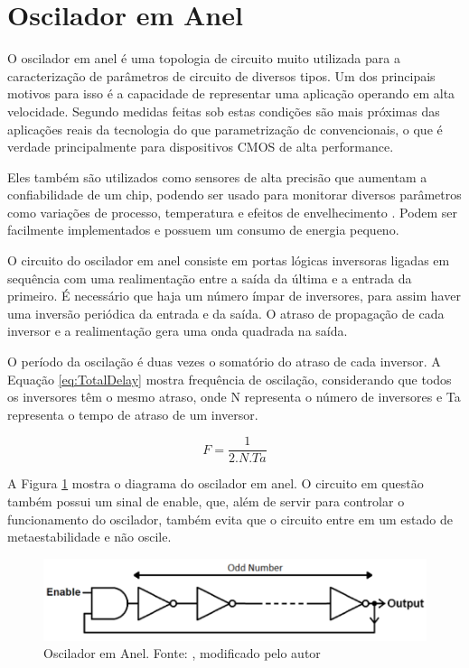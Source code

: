 \section{Oscilador em Anel}
O oscilador em anel é uma topologia de circuito muito utilizada para a caracterização de parâmetros de circuito de diversos tipos. Um dos principais motivos para isso é a capacidade de representar uma aplicação operando em alta velocidade. Segundo \cite{Bhushan} medidas feitas sob estas condições são mais próximas das aplicações reais da tecnologia do que parametrização dc convencionais, o que é verdade principalmente para dispositivos CMOS de alta performance.

Eles também são utilizados como sensores de alta precisão que aumentam a confiabilidade de um chip, podendo ser usado para monitorar diversos parâmetros como variações de processo, temperatura e efeitos de envelhecimento \cite{Sato}. Podem ser facilmente implementados e possuem um consumo de energia pequeno.

O circuito do oscilador em anel consiste em portas lógicas inversoras ligadas em sequência com uma realimentação entre a saída da última e a entrada da primeiro. É necessário que haja um número ímpar de inversores, para assim haver uma inversão periódica da entrada e da saída. O atraso de propagação de cada inversor e a realimentação gera uma onda quadrada na saída.

O período da oscilação é duas vezes o somatório do atraso de cada inversor. A Equação \ref{eq:TotalDelay} mostra frequência de oscilação, considerando que todos os inversores têm o mesmo atraso, onde N representa o número de inversores e Ta representa o tempo de atraso de um inversor.

\begin{equation}
    F = \frac{1}{2.N.Ta}
    \label{eq:TotalDelay}
\end{equation}
         
A Figura \ref{fig:RingOsc} mostra o diagrama do oscilador em anel. O circuito em questão também possui um sinal de enable, que, além de servir para controlar o funcionamento do oscilador, também evita que o circuito entre em um estado de metaestabilidade e não oscile.

\begin{figure}[H]
    \centering
    \includegraphics[width=\linewidth]{figures/ReferencialTeorico/RingOscModified.png}
    \caption{Oscilador em Anel. Fonte: \cite{Sparkfun}, modificado pelo autor}
    \label{fig:RingOsc}
\end{figure}

